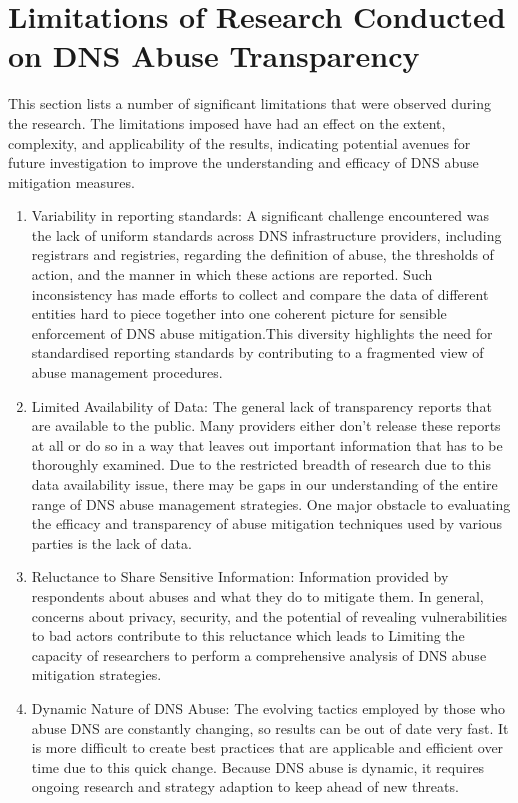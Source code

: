 \section{Limitations of Research Conducted on DNS Abuse Transparency }

This section lists a number of significant limitations that were observed during the research. The limitations imposed have had an effect on the extent, complexity, and applicability of the results, indicating potential avenues for future investigation to improve the understanding and efficacy of DNS abuse mitigation measures.

\begin{enumerate}
    \item Variability in reporting standards: A significant challenge encountered was the lack of uniform standards across DNS infrastructure providers, including registrars and registries, regarding the definition of abuse, the thresholds of action, and the manner in which these actions are reported. Such inconsistency has made efforts to collect and compare the data of different entities hard to piece together into one coherent picture for sensible enforcement of DNS abuse mitigation.This diversity highlights the need for standardised reporting standards by contributing to a fragmented view of abuse management procedures.

    \item Limited Availability of Data: The general lack of transparency reports that are available to the public. Many providers either don't release these reports at all or do so in a way that leaves out important information that has to be thoroughly examined. Due to the restricted breadth of research due to this data availability issue, there may be gaps in our understanding of the entire range of DNS abuse management strategies. One major obstacle to evaluating the efficacy and transparency of abuse mitigation techniques used by various parties is the lack of data.

    \item Reluctance to Share Sensitive Information: Information provided by respondents about abuses and what they do to mitigate them. In general, concerns about privacy, security, and the potential of revealing vulnerabilities to bad actors contribute to this reluctance which leads to Limiting the capacity of researchers to perform a comprehensive analysis of DNS abuse mitigation strategies.
    
    \item Dynamic Nature of DNS Abuse: The evolving tactics employed by those who abuse DNS are constantly changing, so results can be out of date very fast. It is more difficult to create best practices that are applicable and efficient over time due to this quick change. Because DNS abuse is dynamic, it requires ongoing research and strategy adaption to keep ahead of new threats.


\end{enumerate}
